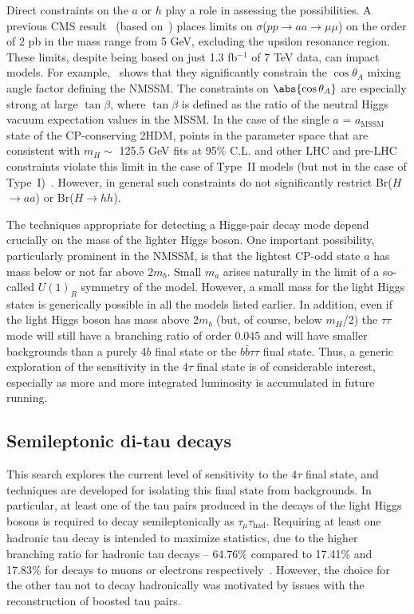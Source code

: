 Direct constraints on the $a$ or $h$ play a role in assessing the possibilities. A previous CMS result~\cite{Chatrchyan:2012am} (based on~\cite{Dermisek:2009fd}) places limits on $\sigma$($pp$$\rightarrow$$aa$$\rightarrow$$\mu\mu$) on the order of 2 pb in the mass range from 5 GeV, excluding the upsilon resonance region.  These limits, despite being based on just 1.3 fb$^{-1}$ of 7 TeV data, can impact models. For example,~\cite{Chatrchyan:2012am} shows that they significantly constrain the $\cos\theta_A$ mixing angle factor defining the NMSSM.  The constraints on $\abs{\cos\theta_A}$ are especially strong at large $\tan\beta$, where $\tan\beta$ is defined as the ratio of the neutral Higgs vacuum expectation values in the MSSM. In the case of the single $a$ = $a_{\text{MSSM}}$ state of the CP-conserving 2HDM, points in the parameter space that are consistent with $m_H \sim$ 125.5 GeV fits at 95\% C.L. and other LHC and pre-LHC constraints violate this limit in the case of Type~II models (but not in the case of Type~I)~\cite{Dumont:2014wha}.  However, in general such constraints do not significantly restrict Br($H$$\rightarrow$$aa$) or Br($H$$\rightarrow$$hh$).  

The techniques appropriate for detecting a Higgs-pair decay mode depend crucially on the mass of the lighter Higgs boson. One important possibility, particularly prominent in the NMSSM, is that the lightest CP-odd state $a$ has mass below or not far above $2m_b$. Small $m_a$ arises naturally in the limit of a so-called $U(1)_R$ symmetry of the model. However, a small mass for the light Higgs states is generically possible in all the models listed earlier. In addition, even if the light Higgs boson has mass above $2m_b$ (but, of course, below $m_H$/2) the $\tau\tau$ mode will still have a branching ratio of order 0.045 and will have smaller backgrounds than a purely 4$b$ final state or the $b\bar{b}\tau\tau$ final state. Thus, a generic exploration of the sensitivity in the $4\tau$ final state is of considerable interest, especially as more and more integrated luminosity is accumulated in future running.

\subsection{Semileptonic di-tau decays\label{sec:semileptonic}}
This search explores the current level of sensitivity to the $4\tau$ final state, and techniques are developed for isolating this final state from backgrounds. In particular, at least one of the tau pairs produced in the decays of the light Higgs bosons is required to decay semileptonically as $\tau_{\mu}\tau_{\text{had}}$. Requiring at least one hadronic tau decay is intended to maximize statistics, due to the higher branching ratio for hadronic tau decays -- 64.76\% compared to 17.41\% and 17.83\% for decays to muons or electrons respectively~\cite{Agashe:2014kda}. However, the choice for the other tau not to decay hadronically was motivated by issues with the reconstruction of boosted tau pairs.

